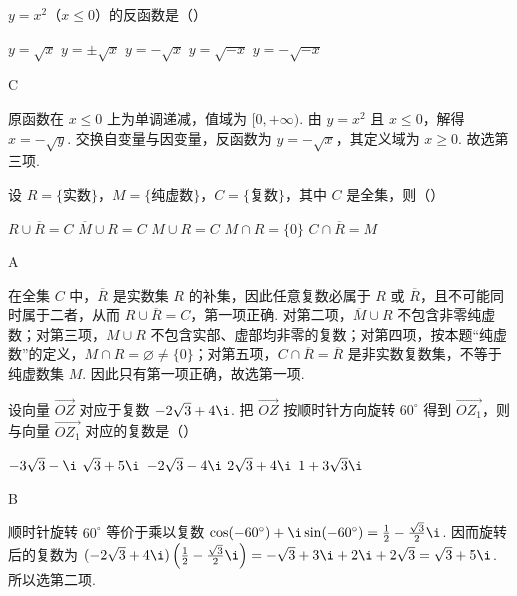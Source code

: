 \begin{problem}

\(y = x^{2}\)（\(x \leqslant 0\)）的反函数是（\quad）

\choicesfive
    {\(y = \sqrt{x} \)}
    {\(y = \pm \sqrt{x} \)}
    {\(y = -\sqrt{x} \)}
    {\(y = \sqrt{-x} \)}
    {\(y = -\sqrt{-x} \)}
\begin{answer}
C
\end{answer}

\begin{solution}
原函数在 \(x\leqslant0\) 上为单调递减，值域为 \([0,+\infty)\). 由 \(y=x^{2}\) 且 \(x\leqslant0\)，解得 \(x=-\sqrt y\). 交换自变量与因变量，反函数为 \(y=-\sqrt x\)，其定义域为 \(x\geqslant0\). 故选第三项.
\end{solution}
\end{problem}

\begin{problem}

设 \(R = \{\text{实数}\}\)，\(M = \{\text{纯虚数}\}\)，\(C = \{\text{复数}\}\)，其中 \(C\) 是全集，则（\quad）

\choicesfive
    {\(R \cup \overline{R} = C\)}
    {\(\overline{M} \cup R = C\)}
    {\(M \cup R = C\)}
    {\(M \cap R = \{0\} \)}
    {\(C \cap \overline{R} = M\)}
\begin{answer}
A
\end{answer}

\begin{solution}
在全集 \(C\) 中，\(\overline R\) 是实数集 \(R\) 的补集，因此任意复数必属于 \(R\) 或 \(\overline R\)，且不可能同时属于二者，从而 \(R\cup\overline R=C\)，第一项正确. 对第二项，\(\overline M\cup R\) 不包含非零纯虚数；对第三项，\(M\cup R\) 不包含实部、虚部均非零的复数；对第四项，按本题“纯虚数”的定义，\(M\cap R=\varnothing\ne\{0\}\)；对第五项，\(C\cap\overline R=\overline R\) 是非实数复数集，不等于纯虚数集 \(M\). 因此只有第一项正确，故选第一项.
\end{solution}
\end{problem}

\begin{problem}

设向量 \(\overrightarrow{OZ}\) 对应于复数 \(-2\sqrt{3} + 4\i\). 把 \(\overrightarrow{OZ}\) 按顺时针方向旋转 \(60^\circ\) 得到 \(\overrightarrow{OZ_1}\)，则与向量 \(\overrightarrow{OZ_1}\) 对应的复数是（\quad）

\choicesfive
    {\(-3\sqrt{3} - \i\)}
    {\(\sqrt{3} + 5\i\)}
    {\(-2\sqrt{3} - 4\i\)}
    {\(2\sqrt{3} + 4\i\)}
    {\(1 + 3\sqrt{3}\i \)}
\begin{answer}
B
\end{answer}

\begin{solution}
顺时针旋转 \(60^{\circ}\) 等价于乘以复数
\(\cos(-60^{\circ})+\i\sin(-60^{\circ})=\frac12-\frac{\sqrt3}{2}\i\). 因而旋转后的复数为
\((-2\sqrt3+4\i)\left(\frac12-\frac{\sqrt3}{2}\i\right)=-\sqrt3+3\i+2\i+2\sqrt3=\sqrt3+5\i\). 所以选第二项.
\end{solution}
\end{problem}

